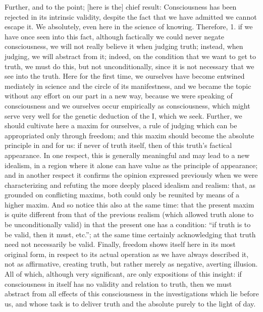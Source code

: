 Further, and to the point;
[here is the] chief result:
Consciousness has been rejected in its intrinsic validity,
despite the fact that we have admitted we cannot escape it.
We absolutely, even here in the science of knowing.
Therefore,
1. if we have once seen into this fact,
although factically we could never negate consciousness,
we will not really believe it when judging truth;
instead, when judging, we will abstract from it;
indeed, on the condition that we want to get to truth,
we must do this, but not unconditionally,
since it is not necessary that we see into the truth.
Here for the first time,
we ourselves have become entwined mediately
in science and the circle of its manifestness,
and we became the topic without any effort on our part
in a new way, because we were speaking of consciousness
and we ourselves occur empirically as consciousness,
which might serve very well for
the genetic deduction of the I, which we seek.
Further, we should cultivate here a maxim for ourselves,
a rule of judging which can be appropriated only through freedom;
and this maxim should become
the absolute principle in and for us:
if never of truth itself,
then of this truth's factical appearance.
In one respect, this is generally meaningful
and may lead to a new idealism,
in a region where it alone can have value
as the principle of appearance;
and in another respect it confirms
the opinion expressed previously
when we were characterizing and refuting
the more deeply placed idealism and realism:
that, as grounded on conflicting maxims,
both could only be reunited
by means of a higher maxim.
And so notice this also at the same time:
that the present maxim is quite different
from that of the previous realism
(which allowed truth alone to be unconditionally valid)
in that the present one has a condition:
“if truth is to be valid, then it must, etc.”;
at the same time certainly acknowledging that
truth need not necessarily be valid.
Finally, freedom shows itself here
in its most original form,
in respect to its actual operation
as we have always described it,
not as affirmative, creating truth,
but rather merely as negative, averting illusion.
All of which, although very significant,
are only expositions of this insight:
if consciousness in itself has
no validity and relation to truth,
then we must abstract from
all effects of this consciousness in
the investigations which lie before us,
and whose task is to deliver truth
and the absolute purely to the light of day.

